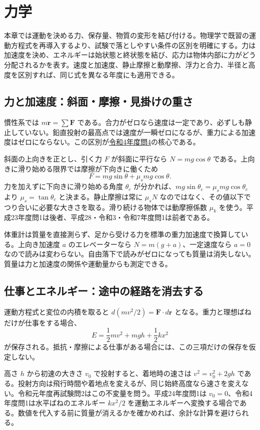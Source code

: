 \chapter{力学}
本章では運動を決める力、保存量、物質の変形を結び付ける。物理学で既習の運動方程式を再導入するより、試験で落としやすい条件の区別を明確にする。力は加速度を決め、エネルギーは始状態と終状態を結び、応力は物体内部に力がどう分配されるかを表す。速度と加速度、静止摩擦と動摩擦、浮力と合力、半径と高度を区別すれば、同じ式を異なる年度にも適用できる。

\section{力と加速度：斜面・摩擦・見掛けの重さ}
\label{theory:mechanics:newton}
慣性系では $m\ddot{\boldsymbol r}=\sum\boldsymbol F$ である。合力がゼロなら速度は一定であり、必ずしも静止していない。鉛直投射の最高点では速度が一瞬ゼロになるが、重力による加速度はゼロにならない。この区別が\hyperref[q:r04-reg-applied-04]{令和4年度問4}の核心である。

斜面の上向きを正とし、引く力 $F$ が斜面に平行なら $N=mg\cos\theta$ である。上向きに滑り始める限界では摩擦が下向きに働くため
\[
 F=mg\sin\theta+\mu_s mg\cos\theta.
\]
力を加えずに下向きに滑り始める角度 $\theta_c$ が分かれば、$mg\sin\theta_c=\mu_s mg\cos\theta_c$ より $\mu_s=\tan\theta_c$ と決まる。静止摩擦は常に $\mu_sN$ なのではなく、その値以下でつり合いに必要な大きさを取る。滑り続ける物体では動摩擦係数 $\mu_k$ を使う。平成23年度問1は後者、平成28・令和3・令和7年度問1は前者である。

体重計は質量を直接測らず、足から受ける力を標準の重力加速度で換算している。上向き加速度 $a$ のエレベーターなら $N=m(g+a)$、一定速度なら $a=0$ なので読みは変わらない。自由落下で読みがゼロになっても質量は消失しない。質量は力と加速度の関係や運動量からも測定できる。

\section{仕事とエネルギー：途中の経路を消去する}
\label{theory:mechanics:energy}
運動方程式と変位の内積を取ると $d(mv^2/2)=\boldsymbol F\cdot d\boldsymbol r$ となる。重力と理想ばねだけが仕事をする場合、
\[
 E=\frac12 mv^2+mgh+\frac12 kx^2
\]
が保存される。抵抗・摩擦による仕事がある場合には、この三項だけの保存を仮定しない。

高さ $h$ から初速の大きさ $v_0$ で投射すると、着地時の速さは $v^2=v_0^2+2gh$ である。投射方向は飛行時間や着地点を変えるが、同じ始終高度なら速さを変えない。令和元年度再試験問2はこの不変量を問う。平成24年度問1は $v_0=0$、令和4年度問1は水平ばねのエネルギー $kx^2/2$ を運動エネルギーへ変換する場合である。数値を代入する前に質量が消えるかを確かめれば、余計な計算を避けられる。

